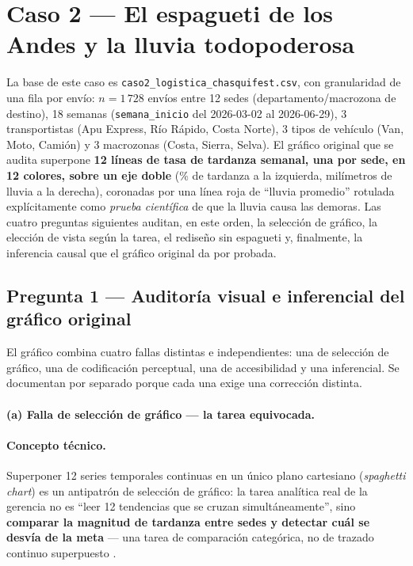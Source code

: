 \section{Caso 2 --- El espagueti de los Andes y la lluvia todopoderosa}\label{sec:caso2}

La base de este caso es \texttt{caso2\_logistica\_chasquifest.csv}, con granularidad de una fila por envío: $n=1\,728$ envíos entre 12 sedes (departamento/macrozona de destino), 18 semanas (\lstinline|semana_inicio| del 2026-03-02 al 2026-06-29), 3 transportistas (Apu Express, Río Rápido, Costa Norte), 3 tipos de vehículo (Van, Moto, Camión) y 3 macrozonas (Costa, Sierra, Selva). El gráfico original que se audita superpone \textbf{12 líneas de tasa de tardanza semanal, una por sede, en 12 colores, sobre un eje doble} (\% de tardanza a la izquierda, milímetros de lluvia a la derecha), coronadas por una línea roja de ``lluvia promedio'' rotulada explícitamente como \emph{prueba científica} de que la lluvia causa las demoras. Las cuatro preguntas siguientes auditan, en este orden, la selección de gráfico, la elección de vista según la tarea, el rediseño sin espagueti y, finalmente, la inferencia causal que el gráfico original da por probada.

\subsection{Pregunta 1 --- Auditoría visual e inferencial del gráfico original}\label{ssec:c2-q1}

El gráfico combina cuatro fallas distintas e independientes: una de selección de gráfico, una de codificación perceptual, una de accesibilidad y una inferencial. Se documentan por separado porque cada una exige una corrección distinta.

\paragraph{(a) Falla de selección de gráfico --- la tarea equivocada.}

\paragraph{Concepto técnico.} Superponer 12 series temporales continuas en un único plano cartesiano (\emph{spaghetti chart}) es un antipatrón de selección de gráfico: la tarea analítica real de la gerencia no es ``leer 12 tendencias que se cruzan simultáneamente'', sino \textbf{comparar la magnitud de tardanza entre sedes y detectar cuál se desvía de la meta} --- una tarea de comparación categórica, no de trazado continuo superpuesto \citep{cleveland1984graphical}.

